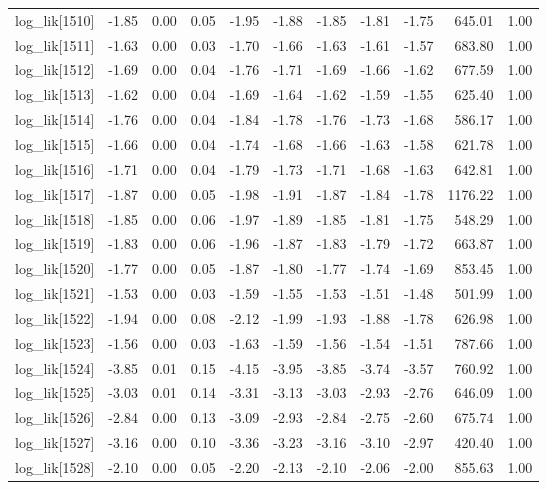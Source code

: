 \begin{table}[ht]
\begin{tabular}{rrrrrrrrrrr}
  log\_lik[1510] & -1.85 & 0.00 & 0.05 & -1.95 & -1.88 & -1.85 & -1.81 & -1.75 & 645.01 & 1.00 \\ 
  log\_lik[1511] & -1.63 & 0.00 & 0.03 & -1.70 & -1.66 & -1.63 & -1.61 & -1.57 & 683.80 & 1.00 \\ 
  log\_lik[1512] & -1.69 & 0.00 & 0.04 & -1.76 & -1.71 & -1.69 & -1.66 & -1.62 & 677.59 & 1.00 \\ 
  log\_lik[1513] & -1.62 & 0.00 & 0.04 & -1.69 & -1.64 & -1.62 & -1.59 & -1.55 & 625.40 & 1.00 \\ 
  log\_lik[1514] & -1.76 & 0.00 & 0.04 & -1.84 & -1.78 & -1.76 & -1.73 & -1.68 & 586.17 & 1.00 \\ 
  log\_lik[1515] & -1.66 & 0.00 & 0.04 & -1.74 & -1.68 & -1.66 & -1.63 & -1.58 & 621.78 & 1.00 \\ 
  log\_lik[1516] & -1.71 & 0.00 & 0.04 & -1.79 & -1.73 & -1.71 & -1.68 & -1.63 & 642.81 & 1.00 \\ 
  log\_lik[1517] & -1.87 & 0.00 & 0.05 & -1.98 & -1.91 & -1.87 & -1.84 & -1.78 & 1176.22 & 1.00 \\ 
  log\_lik[1518] & -1.85 & 0.00 & 0.06 & -1.97 & -1.89 & -1.85 & -1.81 & -1.75 & 548.29 & 1.00 \\ 
  log\_lik[1519] & -1.83 & 0.00 & 0.06 & -1.96 & -1.87 & -1.83 & -1.79 & -1.72 & 663.87 & 1.00 \\ 
  log\_lik[1520] & -1.77 & 0.00 & 0.05 & -1.87 & -1.80 & -1.77 & -1.74 & -1.69 & 853.45 & 1.00 \\ 
  log\_lik[1521] & -1.53 & 0.00 & 0.03 & -1.59 & -1.55 & -1.53 & -1.51 & -1.48 & 501.99 & 1.00 \\ 
  log\_lik[1522] & -1.94 & 0.00 & 0.08 & -2.12 & -1.99 & -1.93 & -1.88 & -1.78 & 626.98 & 1.00 \\ 
  log\_lik[1523] & -1.56 & 0.00 & 0.03 & -1.63 & -1.59 & -1.56 & -1.54 & -1.51 & 787.66 & 1.00 \\ 
  log\_lik[1524] & -3.85 & 0.01 & 0.15 & -4.15 & -3.95 & -3.85 & -3.74 & -3.57 & 760.92 & 1.00 \\ 
  log\_lik[1525] & -3.03 & 0.01 & 0.14 & -3.31 & -3.13 & -3.03 & -2.93 & -2.76 & 646.09 & 1.00 \\ 
  log\_lik[1526] & -2.84 & 0.00 & 0.13 & -3.09 & -2.93 & -2.84 & -2.75 & -2.60 & 675.74 & 1.00 \\ 
  log\_lik[1527] & -3.16 & 0.00 & 0.10 & -3.36 & -3.23 & -3.16 & -3.10 & -2.97 & 420.40 & 1.00 \\ 
  log\_lik[1528] & -2.10 & 0.00 & 0.05 & -2.20 & -2.13 & -2.10 & -2.06 & -2.00 & 855.63 & 1.00 \\ 

\end{tabular}
\end{table}
